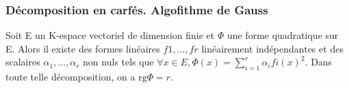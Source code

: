 \subsubsection{ Décomposition en carfés. Algofithme de Gauss}
%
\begin{thm} 
	Soit E un K-espace vectoriel
de dimension finie et $\Phi$ une forme quadratique sur E. Alors il existe
des formes linéaires
$f1,\ldots,fr$
linéairement indépendantes et des scalaires
$\alpha_1,\ldots,\alpha_r$
non nuls tels que $\forall x \in E, \Phi(x)
= \sum_{i=1}^r \alpha_i fi(x)^2$. Dans toute
telle décomposition, on a
$\mathrm{rg} \Phi = r$.
\end{thm}
%
%
%
%
%
%
